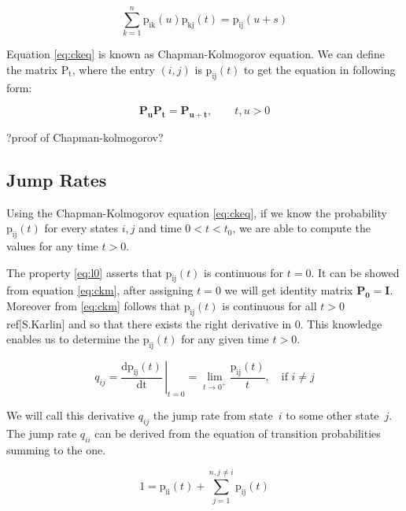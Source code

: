 \documentclass[thesis=M,english]{FITthesis}[2012/10/20]
\newcommand{\matr}[1]{\mathbf{#1}}
\begin{document}
\begin{equation}\label{eq:ckeq}
\sum_{k = 1}^n\mathrm{p_{ik}}(u)\mathrm{p_{kj}}(t) = \mathrm{p_{ij}}(u+s)     
\end{equation}

Equation \eqref{eq:ckeq} is known as Chapman-Kolmogorov equation. 
We can define the matrix $\mathrm{P_t}$, where the entry $(i,j)$ is $\mathrm{p_{ij}}(t)$ to get the equation in following form:

\begin{equation}\label{eq:ckm}
\matr{P_u} \matr{P_t} = \matr{P_{u+t}},   \qquad t,u > 0  
\end{equation}

?proof of Chapman-kolmogorov?


\subsection{ Jump Rates }

Using the Chapman-Kolmogorov equation \eqref{eq:ckeq}, if we know the probability $\mathrm{p_{ij}}(t)$ for every states $i,j$ and time $0 < t < t_0$, we are able to compute the values for any time $t > 0$. 

The property \eqref{eq:l0}  asserts that $\mathrm{p_{ij}}(t)$ is continuous for $t=0$. It can be showed from equation \eqref{eq:ckm}, after assigning $t=0$ we will get identity matrix $\matr{P_0} = \matr{I}$.
Moreover from \eqref{eq:ckm} follows that $\mathrm{p_{ij}}(t)$ is continuous for all $t>0$ ref[S.Karlin] and so that there exists the right derivative in 0. This knowledge enables us to determine the $\mathrm{p_{ij}}(t)$ for any given time $t>0$.   

\begin{equation}
q_{ij} =  \left.\frac{\mathrm{d}\mathrm{p_{ij}}(t)}{\mathrm{dt}} \,\right|_{t=0} = \lim_{t \to 0^+} \frac{\mathrm{p_{ij}}(t)}{t}, \quad \text{if } i\neq j     
\end{equation}

We will call this derivative $q_{ij}$ the jump rate from state~$i$ to some other state~$j$. The jump rate $q_{ii}$ can be derived from the equation of transition probabilities summing to the one.

\begin{equation}
1 = \mathrm{p_{ii}}(t) + \sum_{j = 1}^{ n ,j \neq i} \mathrm{p_{ij}}(t) 
\end{equation}
\end{document}
